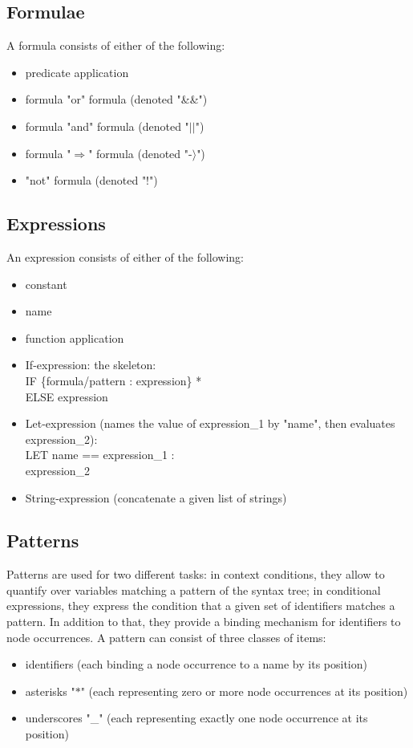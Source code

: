 \subsection{Formulae}
A formula consists of either of the following:
\begin{itemize}
\item predicate application
\item formula "or" formula (denoted "\&\&")
\item formula "and" formula (denoted "$\mid$$\mid$")
\item formula "$\Rightarrow$" formula (denoted "-$\rangle$")
\item "not" formula (denoted "!")
\end{itemize}

\subsection{Expressions}
An expression consists of either of the following:
\begin{itemize}
\item constant
\item name
\item function application
\item If-expression: the skeleton:\\
                IF \{formula/pattern : expression\} *\\
                ELSE expression 
\item Let-expression (names the value of expression\_1 by "name", then evaluates expression\_2):\\
                     LET name == expression\_1 :\\
                     expression\_2
\item String-expression (concatenate a given list of strings)
\end{itemize}


\subsection{Patterns}

Patterns are used for two different tasks: in context conditions, they
allow to quantify over variables matching a pattern of the syntax tree;
in conditional expressions, they express the condition that a given
set of identifiers matches a pattern. In addition to that,
they provide a binding mechanism for identifiers to node occurrences. 
A pattern can consist of three classes of items:
\begin{itemize}
\item identifiers (each binding a node occurrence to a name by its position)
\item asterisks "$\ast$" (each representing zero or more node occurrences at its position)
\item underscores "\_" (each representing exactly one node occurrence at its position)
\end{itemize}


